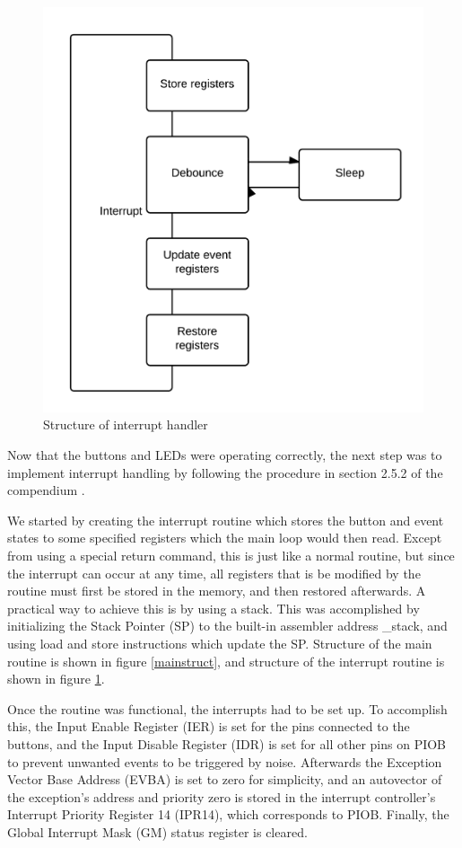 \begin{figure}
  \centering
    \includegraphics[height=0.4\textheight]{Interrupt}
  \caption{Structure of interrupt handler}
  \label{interruptstruct}
\end{figure}


Now that the buttons and LEDs were operating correctly, the next step was to implement interrupt handling by following the procedure in section 2.5.2 of the compendium \cite{compendium}.

We started by creating the interrupt routine which stores the button and event states to some specified registers which the main loop would then read. Except from using a special return command, this is just like a normal routine, but since the interrupt can occur at any time, all registers that is be modified by the routine must first be stored in the memory, and then restored afterwards. A practical way to achieve this is by using a stack. This was accomplished by initializing the Stack Pointer (SP) to the built-in assembler address \_stack, and using load and store instructions which update the SP. Structure of the main routine is shown in figure \ref{mainstruct}, and structure of the interrupt routine is shown in figure \ref{interruptstruct}.

Once the routine was functional, the interrupts had to be set up. To accomplish this, the Input Enable Register (IER) is set for the pins connected to the buttons, and the Input Disable Register (IDR) is set for all other pins on PIOB to prevent unwanted events to be triggered by noise. Afterwards the Exception Vector Base Address (EVBA) is set to zero for simplicity, and an autovector of the exception’s address and priority zero is stored in the interrupt controller’s Interrupt Priority Register 14 (IPR14), which corresponds to PIOB. Finally, the Global Interrupt Mask (GM) status register is cleared.

